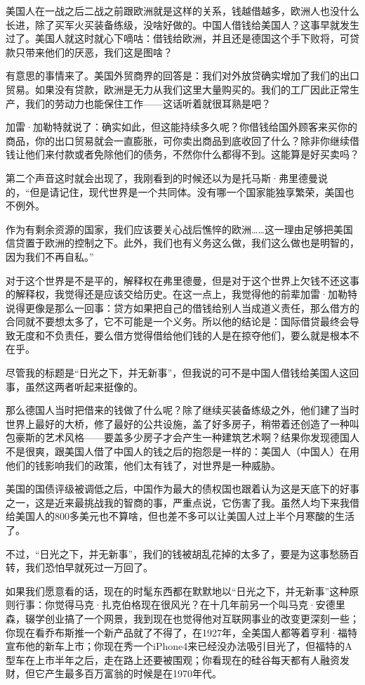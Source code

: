 美国人在一战之后二战之前跟欧洲就是这样的关系，钱越借越多，欧洲人也没什么长进，除了买军火买装备练级，没啥好做的。中国人借钱给美国人？这事早就发生过了。美国人就这时就心下嘀咕：借钱给欧洲，并且还是德国这个手下败将，可贷款只带来他们的厌恶，我们这是图啥？

有意思的事情来了。美国外贸商界的回答是：我们对外放贷确实增加了我们的出口贸易。如果没有贷款，欧洲是无力从我们这里大量购买的。我们的工厂因此正常生产，我们的劳动力也能保住工作------这话听着就很耳熟是吧？

加雷·加勒特就说了：确实如此，但这能持续多久呢？你借钱给国外顾客来买你的商品，你的出口贸易就会一直膨胀，可你卖出商品到底收回了什么？除非你继续借钱让他们来付款或者免除他们的债务，不然你什么都得不到。这能算是好买卖吗？

第二个声音这时就会出现了，我刚看到的时候还以为是托马斯·弗里德曼说的，``但是请记住，现代世界是一个共同体。没有哪一个国家能独享繁荣，美国也不例外。

作为有剩余资源的国家，我们应该要关心战后憔悴的欧洲\ldots{}\ldots{}这一理由足够把美国信贷置于欧洲的控制之下。此外，我们也有义务这么做，我们这么做也是明智的，因为我们不再自私。''

对于这个世界是不是平的，解释权在弗里德曼，但是对于这个世界上欠钱不还这事的解释权，我觉得还是应该交给历史。在这一点上，我觉得他的前辈加雷·加勒特说得更像是那么一回事：贷方如果把自己的借钱给别人当成道义责任，那么借方的合同就不要想太多了，它不可能是一个义务。所以他的结论是：国际借贷最终会导致无度和不负责任，要么借方觉得借给他们钱的人是在掠夺他们，要么就是根本不在乎。

尽管我的标题是``日光之下，并无新事''，但我说的可不是中国人借钱给美国人这回事，虽然这两者听起来挺像的。

那么德国人当时把借来的钱做了什么呢？除了继续买装备练级之外，他们建了当时世界上最好的大桥，修了最好的公共设施，盖了好多房子，稍带着还创造了一种叫包豪斯的艺术风格------要盖多少房子才会产生一种建筑艺术啊？结果你发现德国人不是很爽，跟美国人借了中国人的钱之后的抱怨是一样的：美国人（中国人）在用他们的钱影响我们的政策，他们太有钱了，对世界是一种威胁。

美国的国债评级被调低之后，中国作为最大的债权国也跟着认为这是天底下的好事之一，这是近来最挑战我的智商的事，严重点说，它伤害了我。虽然人均下来我借给美国人的800多美元也不算啥，但也差不多可以让美国人过上半个月寒酸的生活了。

不过，``日光之下，并无新事''，我们的钱被胡乱花掉的太多了，要是为这事愁肠百转，我们恐怕早就死过一万回了。

如果我们愿意看的话，现在的时髦东西都在默默地以``日光之下，并无新事''这种原则行事：你觉得马克·扎克伯格现在很风光？在十几年前另一个叫马克·安德里森，辍学创业搞了一个网景，我到现在也觉得他对互联网事业的改变更深刻一些；你现在看乔布斯推一个新产品就了不得了，在1927年，全美国人都等着亨利·福特宣布他的新车上市；你现在秀一个iPhone4来已经没办法吸引目光了，但福特的A型车在上市半年之后，走在路上还要被围观；你看现在的硅谷每天都有人融资发财，但它产生最多百万富翁的时候是在1970年代。

